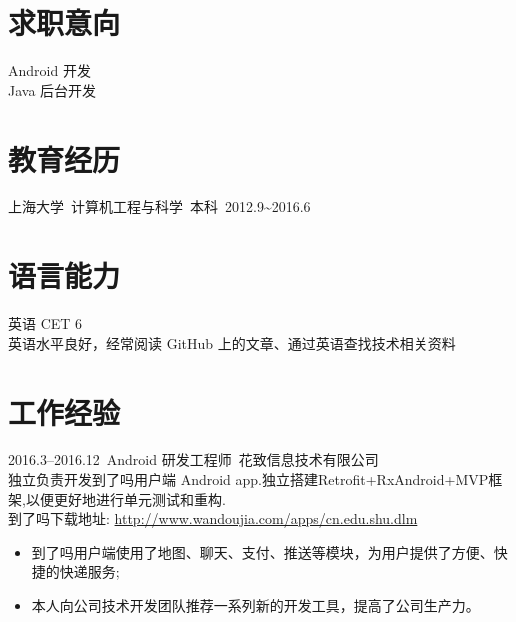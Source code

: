 \documentclass[11pt]{res}
\begin{document}
\address{  beatbox\_gao@hotmail.com\\ GitHub:\url{https://github.com/abcghy}}
\address{上海宝山 \\  18818217393}

\begin{resume}

\section{求职意向}
  Android 开发\\    
  Java 后台开发

\section{教育经历}
  上海大学\ 计算机工程与科学\ 本科\ 2012.9\~{}2016.6

\section{语言能力}
  英语 CET 6 \\英语水平良好，经常阅读 GitHub 上的文章、通过英语查找技术相关资料

\section{工作经验}
  2016.3--2016.12\ Android 研发工程师\ 花致信息技术有限公司\\独立负责开发到了吗用户端 Android app.独立搭建Retrofit+RxAndroid+MVP框架,以便更好地进行单元测试和重构.\\到了吗下载地址: \url{http://www.wandoujia.com/apps/cn.edu.shu.dlm}
  \begin{itemize}
    \item 到了吗用户端使用了地图、聊天、支付、推送等模块，为用户提供了方便、快捷的快递服务;
    \item 本人向公司技术开发团队推荐一系列新的开发工具，提高了公司生产力。
  \end{itemize}


\end{resume}
\end{document}

